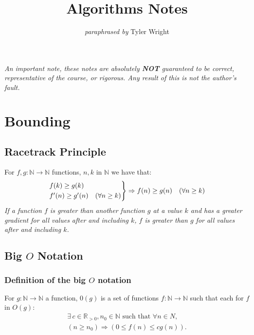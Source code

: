 \documentclass[a4paper, 12pt, twoside]{article}
\begin{document}
\title{Algorithms Notes}
\date{}
\author{\textit{paraphrased by} Tyler Wright}
\maketitle

\vfill

\textit{An important note, these notes are absolutely \textbf{NOT}
      guaranteed to be correct, representative of the course, or rigorous.
      Any result of this is not the author's fault.}

\newpage

\section{Bounding}

\subsection{Racetrack Principle}

For $f, g : \mathbb{N} \to \mathbb{N}$ functions, $n, k$ in $\mathbb{N}$
we have that:
\begin{align*}
      \begin{rcases*}
            f(k) \geq g(k) \\
            f'(n) \geq g'(n) \quad (\forall n \geq k)
      \end{rcases*} \Rightarrow
      f(n) \geq g(n) \quad (\forall n \geq k)
\end{align*}
\textit{If a function $f$ is greater than another function $g$ 
at a value $k$ and has a greater gradient for all values after
and including $k$, $f$ is greater than $g$ for all values 
after and including $k$.}

\subsection{Big $O$ Notation}

\subsubsection{Definition of the big $O$ notation}

For $g : \mathbb{N} \to \mathbb{N}$ a function, $0(g)$ is a set of
functions $f : \mathbb{N} \to \mathbb{N}$ such that each for
$f$ in $O(g)$:
\begin{gather*}
      \exists \, c \in \mathbb{R}_{>0}, n_0 \in \mathbb{N}
      \text{ such that } \forall n \in N, \\
      (n \geq n_0) \Rightarrow (0 \leq f(n) \leq cg(n)).
\end{gather*}
\end{document}
